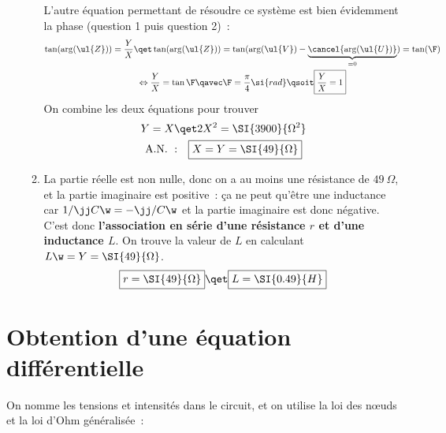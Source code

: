 \documentclass[a4paper, 12pt, final, garamond]{book}
\begin{document}
\begin{enumerate}
\begin{enumerate}
                L'autre équation permettant de résoudre ce système est bien
                évidemment la phase (question 1 puis question 2)~:
                \begin{gather*}
                    \tan(\arg(\ul{Z})) = \frac{Y}{X} \qet \tan(\arg(\ul{Z})) =
                    \tan(\arg(\ul{V}) -
                    \underbrace{\cancel{\arg(\ul{U})}}_{=0}) = \tan(\F)\\
                    \Leftrightarrow
                    \frac{Y}{X} = \tan\F
                    \qavec
                    \F = \frac{\pi}{4}\si{rad}
                    \qsoit
                    \boxed{\frac{Y}{X} = 1}
                \end{gather*}
                On combine les deux équations pour trouver
                \begin{gather*}
                    Y = X
                    \qet
                    2X^2 = \SI{3900}{\Omega^2}\\
                    \mathrm{A.N.~:}\quad
                    \boxed{X = Y = \SI{49}{\Omega}}
                \end{gather*}
            \item La partie réelle est non nulle, donc on a au moins une
                résistance de $\SI{49}{\Omega}$, et la partie imaginaire est
                positive~: ça ne peut qu'être une inductance car $1/\jj C\w =
                -\jj/C\w$ et la partie imaginaire est donc négative. C'est donc
                \textbf{l'association en série d'une résistance $r$ et d'une
                inductance $L$}. On trouve
                la valeur de $L$ en calculant $L\w = Y = \SI{49}{\Omega}$.
                \[
                    \boxed{r = \SI{49}{\Omega}}
                    \qet
                    \boxed{L = \SI{0.49}{H}}
                \]
        \end{enumerate}
\end{enumerate}

\section{Obtention d'une équation différentielle}
On nomme les tensions et intensités dans le circuit, et on utilise la loi des
nœuds et la loi d'Ohm généralisée~:
\end{document}
